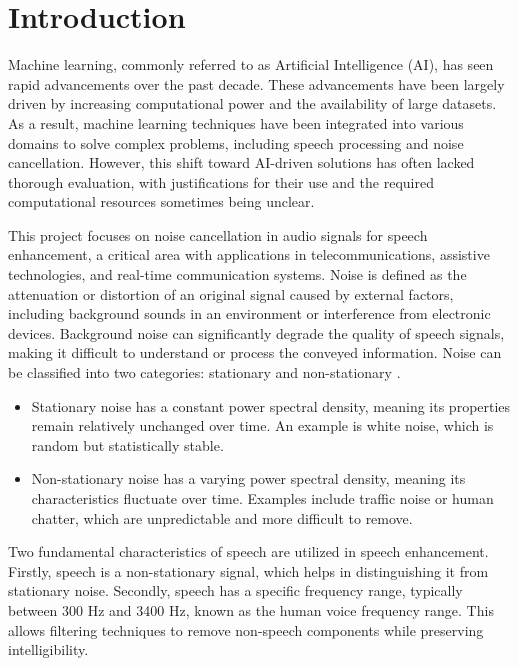 \graphicspath{{content/chapters/1_introduction/figures}}
\chapter{Introduction}
\label{chp:introduction}

Machine learning, commonly referred to as Artificial Intelligence (AI), has seen rapid advancements over the past decade. These advancements have been largely driven by increasing computational power and the availability of large datasets. As a result, machine learning techniques have been integrated into various domains to solve complex problems, including speech processing and noise cancellation. However, this shift toward AI-driven solutions has often lacked thorough evaluation, with justifications for their use and the required computational resources sometimes being unclear.

This project focuses on noise cancellation in audio signals for speech enhancement, a critical area with applications in telecommunications, assistive technologies, and real-time communication systems. Noise is defined as the attenuation or distortion of an original signal caused by external factors, including background sounds in an environment or interference from electronic devices. Background noise can significantly degrade the quality of speech signals, making it difficult to understand or process the conveyed information. Noise can be classified into two categories: stationary and non-stationary \cite{loizou2013speech}.

\begin{itemize}
    \item Stationary noise has a constant power spectral density, meaning its properties remain relatively unchanged over time. An example is white noise, which is random but statistically stable.
    \item Non-stationary noise has a varying power spectral density, meaning its characteristics fluctuate over time. Examples include traffic noise or human chatter, which are unpredictable and more difficult to remove.
\end{itemize}

Two fundamental characteristics of speech are utilized in speech enhancement. Firstly, speech is a non-stationary signal, which helps in distinguishing it from stationary noise. Secondly, speech has a specific frequency range, typically between 300 Hz and 3400 Hz, known as the human voice frequency range. This allows filtering techniques to remove non-speech components while preserving intelligibility.

